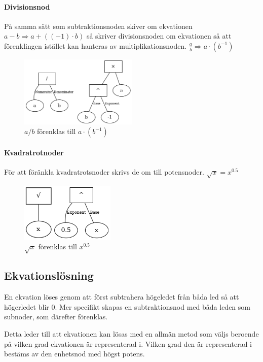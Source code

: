 \documentclass[12pt,a4paper]{article}
\begin{document}
\paragraph{Divisionsnod}
\label{subsubsec:divnode}
På samma sätt som subtraktionsnoden skiver om ekvationen \(a-b\Rightarrow a+((-1) \cdot b)\) så skriver divisionsnoden om ekvationen så att förenklingen istället kan hanteras av multiplikationsnoden. \(\frac{a}{b}\Rightarrow a \cdot (b^{-1})\)
\begin{figure}[h!]
  \centering
  \includegraphics[width=0.5\textwidth]{image-merged4.png}
  \caption{\(a/b\) förenklas till \(a \cdot (b^{-1})\)}
\end{figure}
\paragraph{Kvadratrotnoder}
\label{subsubsec:sqrtnod}
För att föränkla kvadratrotsnoder skrivs de om till potensnoder. \(\sqrt{x}=x^{0.5}\)
\begin{figure}[h!]
  \centering
  \includegraphics[width=0.4\textwidth]{sqrt.png}
  \caption{\(\sqrt{x}\) förenklas till \(x^{0.5}\)}
\end{figure}
\subsection{Ekvationslösning}
En ekvation löses genom att först subtrahera högeledet från båda led så att högerledet blir 0. Mer specifikt skapas en subtraktionsnod med båda leden som subnoder, som därefter förenklas. 
\par Detta leder till att ekvationen kan lösas med en allmän metod som väljs beroende på vilken grad ekvationen är representerad i. Vilken grad den är representerad i bestäms av den enhetsnod med högst potens.
\end{document}
